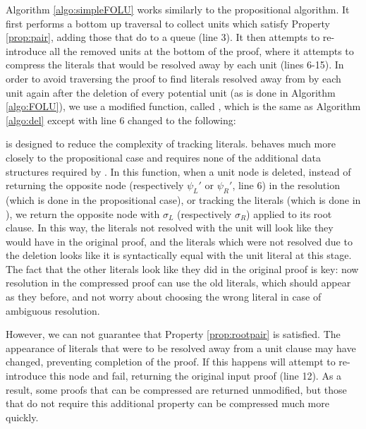 Algorithm \ref{algo:simpleFOLU} works similarly to the propositional algorithm.  It first performs a bottom up traversal to collect units which satisfy Property \ref{prop:pair}, adding those that do to a queue (line 3). It then attempts to re-introduce all the removed units at the bottom of the proof, where it attempts to compress the literals that would be resolved away by each unit (lines 6-15). In order to avoid traversing the proof to find literals resolved away from by each unit again after the deletion of every potential unit (as is done in Algorithm \ref{algo:FOLU}), we use a modified  function, called , which is the same as Algorithm \ref{algo:del} except with line 6 changed to the following:


 is designed to reduce the complexity of tracking literals.  behaves much more closely to the propositional case and requires none of the additional data structures required by . In this function, when a unit node is deleted, instead of returning the opposite node (respectively $\psi_L'$ or $\psi_R'$, line 6) in the resolution (which is done in the propositional case), or tracking the literals (which is done in ), we return the opposite node with $\sigma_L$ (respectively $\sigma_R$) applied to its root clause. In this way, the literals not resolved with the unit will look like they would have in the original proof, and the literals which were not resolved due to the deletion looks like it is syntactically equal with the unit literal at this stage. The fact that the other literals look like they did in the original proof is key: now resolution in the compressed proof can use the old literals, which should appear as they before, and not worry about choosing the wrong literal in case of ambiguous resolution. 


However, we can not guarantee that Property \ref{prop:rootpair} is satisfied. The appearance of literals that were to be resolved away from a unit clause may have changed, preventing completion of the proof. If this happens {\SFOLowerUnits} will attempt to re-introduce this node and fail, returning the original input proof (line 12). As a result, some proofs that can be compressed are returned unmodified, but those that do not require this additional property can be compressed much more quickly.

